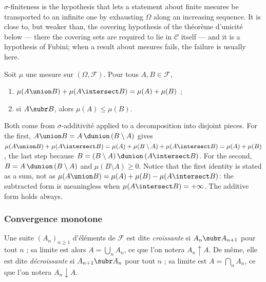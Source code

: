 $\sigma$-finiteness is the hypothesis that lets a statement about finite mesures be
transported to an infinite one by exhausting $\Omega$ along an increasing sequence.
It is close to, but weaker than, the covering hypothesis of the théorème d'unicité
below --- there the covering sets are required to lie in $\mathcal{C}$ itself --- and
it is a hypothesis of Fubini; when a result about mesures fails, the failure is
usually here.

\begin{prop}
  Soit $\mu$ une mesure sur $(\Omega,\mathcal{F})$. Pour tous $A, B \in \mathcal{F}$,
  \begin{enumerate}
    \item $\mu(A \union B) + \mu(A \intersect B) = \mu(A) + \mu(B)$ ;
    \item si $A \subr B$, alors $\mu(A) \leq \mu(B)$.
  \end{enumerate}
\end{prop}

\begin{remark}
  Both come from $\sigma$-additivité applied to a decomposition into disjoint
  pieces. For the first, $A \union B = A \,\dunion\, (B \setminus A)$ gives
  $\mu(A \union B) + \mu(A \intersect B) = \mu(A) + \mu(B \setminus A) + \mu(A
  \intersect B) = \mu(A) + \mu(B)$, the last step because $B = (B \setminus A)
  \,\dunion\, (A \intersect B)$. For the second, $B = A \,\dunion\, (B
  \setminus A)$ and $\mu(B \setminus A) \geq 0$. Notice that the first identity is
  stated as a sum, not as $\mu(A \union B) = \mu(A) + \mu(B) - \mu(A \intersect B)$:
  the subtracted form is meaningless when $\mu(A \intersect B) = +\infty$. The
  additive form holds always.
\end{remark}

\subsubsection{Convergence monotone}

Une suite $(A_{n})_{n \geq 1}$ d'éléments de $\mathcal{F}$ est dite
\emph{croissante} si $A_{n} \subr A_{n+1}$ pour tout $n$ ; sa limite est alors $A =
\bigcup_{n} A_{n}$, ce que l'on notera $A_{n} \uparrow A$. De même, elle est dite
\emph{décroissante} si $A_{n+1} \subr A_{n}$ pour tout $n$ ; sa limite est $A =
\bigcap_{n} A_{n}$, ce que l'on notera $A_{n} \downarrow A$.

